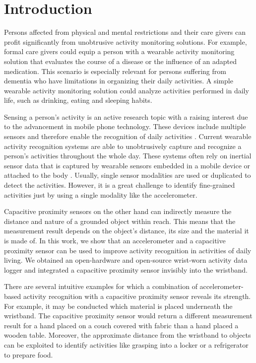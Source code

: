 \documentclass[runningheads,a4paper]{llncs}
\begin{document}
\section{Introduction}

Persons affected from physical and mental restrictions and their care givers can profit significantly from unobtrusive activity monitoring solutions. For example, formal care givers could equip a person with a wearable activity monitoring solution that evaluates the course of a disease or the influence of an adapted medication. This scenario is especially relevant for persons suffering from dementia who have limitations in organizing their daily activities. A simple wearable activity monitoring solution could analyze activities performed in daily life, such as drinking, eating and sleeping habits. 

Sensing a person's activity is an active research topic with a raising interest due to the advancement in mobile phone technology. These devices include multiple sensors and therefore enable the recognition of daily activities \cite{brezmes2009activity}. Current wearable activity recognition systems are able to unobtrusively capture and recognize a person's activities throughout the whole day. These systems often rely on inertial sensor data that is captured by wearable sensors embedded in a mobile device \cite{brezmes2009activity} or attached to the body \cite{Ravi2005}. Usually, single sensor modalities are used or duplicated to detect the activities. However, it is a great challenge to identify fine-grained activities just by using a single modality like the accelerometer.

Capacitive proximity sensors on the other hand can indirectly measure the distance and nature of a grounded object within reach. This means that the measurement result depends on the object's distance, its size and the material it is made of. In this work, we show that an accelerometer and a capacitive proximity sensor can be used to improve activity recognition in activities of daily living.
We obtained an open-hardware and open-source wrist-worn activity data logger \cite{hedgehog} and integrated a capacitive proximity sensor invisibly into the wristband. 

There are several intuitive examples for which a combination of accelerometer-based activity recognition with a capacitive proximity sensor reveals its strength. For example, it may be conducted which material is placed underneath the wristband. The capacitive proximity sensor would return a different measurement result for a hand placed on a couch covered with fabric than a hand placed a wooden table. Moreover, the approximate distance from the wristband to objects can be exploited to identify activities like grasping into a locker or a refrigerator to prepare food.
\end{document}
